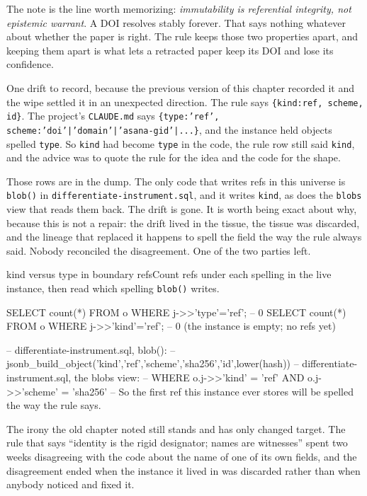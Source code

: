 The note is the line worth memorizing: \emph{immutability is referential integrity, not epistemic warrant}. A DOI resolves stably forever. That says nothing whatever about whether the paper is right. The rule keeps those two properties apart, and keeping them apart is what lets a retracted paper keep its DOI and lose its confidence.

One drift to record, because the previous version of this chapter recorded it and the wipe settled it in an unexpected direction. The rule says \texttt{\{kind:ref, scheme, id\}}. The project's \texttt{CLAUDE.md} says \texttt{\{type:'ref', scheme:'doi'|'domain'|'asana-gid'|...\}}, and the \labLineageName{} instance held \labLineageTypeRefs{} objects spelled \texttt{type}. So \texttt{kind} had become \texttt{type} in the code, the rule row still said \texttt{kind}, and the advice was to quote the rule for the idea and the code for the shape.

Those \labLineageTypeRefs{} rows are in the dump. The only code that writes refs in this universe is \texttt{blob()} in \texttt{differentiate-instrument.sql}, and it writes \texttt{kind}, as does the \texttt{blobs} view that reads them back. The drift is gone. It is worth being exact about why, because this is not a repair: the drift lived in the tissue, the tissue was discarded, and the lineage that replaced it happens to spell the field the way the rule always said. Nobody reconciled the disagreement. One of the two parties left.

\begin{Correspondence}{kind versus type in boundary refs}{Count refs under each spelling in the live instance, then read which spelling \texttt{blob()} writes.}
\begin{Check}
SELECT count(*) FROM o WHERE j->>'type'='ref';   -- 0
SELECT count(*) FROM o WHERE j->>'kind'='ref';   -- 0   (the instance is empty; no refs yet)

-- differentiate-instrument.sql, blob():
--   jsonb_build_object('kind','ref','scheme','sha256','id',lower(hash))
-- differentiate-instrument.sql, the blobs view:
--   WHERE o.j->>'kind' = 'ref' AND o.j->>'scheme' = 'sha256'
-- So the first ref this instance ever stores will be spelled the way the rule says.
\end{Check}
The irony the old chapter noted still stands and has only changed target. The rule that says ``identity is the rigid designator; names are witnesses'' spent two weeks disagreeing with the code about the name of one of its own fields, and the disagreement ended when the instance it lived in was discarded rather than when anybody noticed and fixed it.
\end{Correspondence}


